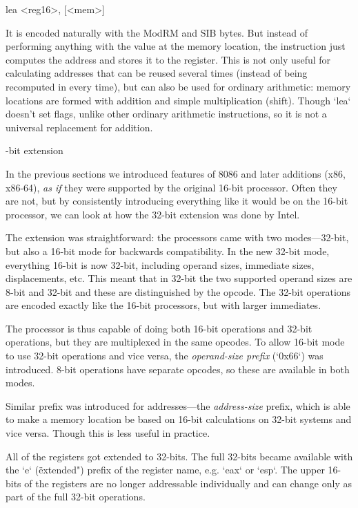 \begtt \optparams
lea <reg16>, [<mem>]
\endtt

It is encoded naturally with the ModRM and SIB bytes. But instead of performing
anything with the value at the memory location, the instruction just computes
the address and stores it to the register. This is not only useful for
calculating addresses that can be reused several times (instead of being
recomputed in every time), but can also be used for ordinary arithmetic: memory
locations are formed with addition and simple multiplication (shift). Though
`lea` doesn't set flags, unlike other ordinary arithmetic instructions, so it is
not a universal replacement for addition.


%

-bit extension

In the previous sections we introduced features of 8086 and later additions
(x86, x86-64), {\em as if} they were supported by the original 16-bit processor.
Often they are not, but by consistently introducing everything like it would be
on the 16-bit processor, we can look at how the 32-bit extension was done by
Intel.

The extension was straightforward: the processors came with two
modes---32-bit, but also a 16-bit mode for backwards compatibility. In the
new 32-bit mode, everything 16-bit is now 32-bit, including operand sizes,
immediate sizes, displacements, etc. This meant that in 32-bit the two supported
operand sizes are 8-bit and 32-bit and these are distinguished by the opcode.
The 32-bit operations are encoded exactly like the 16-bit processors, but with
larger immediates.

The processor is thus capable of doing both 16-bit operations and
32-bit operations, but they are multiplexed in the same opcodes. To allow
16-bit mode to use 32-bit operations and vice versa, the {\em operand-size
prefix} (`0x66`) was introduced. 8-bit operations have separate opcodes, so
these are available in both modes.

Similar prefix was introduced for addresses---the {\em address-size} prefix,
which is able to make a memory location be based on 16-bit calculations on 32-bit
systems and vice versa. Though this is less useful in practice.

All of the registers got extended to 32-bits. The full 32-bits became available
with the `e` (\"extended") prefix of the register name, e.g. `eax` or `esp`. The
upper 16-bits of the registers are no longer addressable individually and can
change only as part of the full 32-bit operations.

